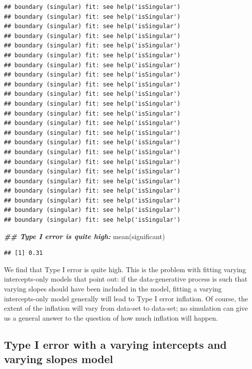 \documentclass[
  12pt,
]{krantz}
\newenvironment{Shaded}{\begin{snugshade}}{\end{snugshade}}
\newcommand{\DocumentationTok}[1]{\textcolor[rgb]{0.56,0.35,0.01}{\textbf{\textit{#1}}}}
\newcommand{\FunctionTok}[1]{\textcolor[rgb]{0.00,0.00,0.00}{#1}}
\newcommand{\NormalTok}[1]{#1}
\theoremstyle{definition}
\theoremstyle{definition}
\theoremstyle{definition}
\theoremstyle{definition}
\theoremstyle{remark}
\begin{document}
\begin{verbatim}
## boundary (singular) fit: see help('isSingular')
## boundary (singular) fit: see help('isSingular')
## boundary (singular) fit: see help('isSingular')
## boundary (singular) fit: see help('isSingular')
## boundary (singular) fit: see help('isSingular')
## boundary (singular) fit: see help('isSingular')
## boundary (singular) fit: see help('isSingular')
## boundary (singular) fit: see help('isSingular')
## boundary (singular) fit: see help('isSingular')
## boundary (singular) fit: see help('isSingular')
## boundary (singular) fit: see help('isSingular')
## boundary (singular) fit: see help('isSingular')
## boundary (singular) fit: see help('isSingular')
## boundary (singular) fit: see help('isSingular')
## boundary (singular) fit: see help('isSingular')
## boundary (singular) fit: see help('isSingular')
## boundary (singular) fit: see help('isSingular')
## boundary (singular) fit: see help('isSingular')
## boundary (singular) fit: see help('isSingular')
## boundary (singular) fit: see help('isSingular')
## boundary (singular) fit: see help('isSingular')
## boundary (singular) fit: see help('isSingular')
## boundary (singular) fit: see help('isSingular')
\end{verbatim}

\begin{Shaded}
\begin{Highlighting}[]
\DocumentationTok{\#\# Type I error is quite high:}
\FunctionTok{mean}\NormalTok{(significant)}
\end{Highlighting}
\end{Shaded}

\begin{verbatim}
## [1] 0.31
\end{verbatim}

We find that Type I error is quite high. This is the problem with fitting varying intercepts-only models that \citet{barr2013} point out: if the data-generative process is such that varying slopes should have been included in the model, fitting a varying intercepts-only model generally will lead to Type I error inflation. Of course, the extent of the inflation will vary from data-set to data-set; no simulation can give us a general answer to the question of how much inflation will happen.

\hypertarget{type-i-error-with-a-varying-intercepts-and-varying-slopes-model}{%
\subsection{Type I error with a varying intercepts and varying slopes model}\label{type-i-error-with-a-varying-intercepts-and-varying-slopes-model}}
\end{document}
